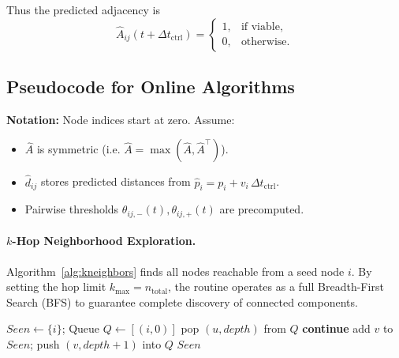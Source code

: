 \documentclass[preprint,12pt]{elsarticle}
\theoremstyle{definition}\newtheorem{definition}{Definition}
\theoremstyle{plain}\newtheorem{theorem}{Theorem}
\theoremstyle{plain}\newtheorem{lemma}{Lemma}
\theoremstyle{plain}\newtheorem{corollary}{Corollary}
\theoremstyle{plain}\newtheorem{assumption}{Assumption}
\theoremstyle{remark}\newtheorem{remark}[theorem]{Remark}
\begin{document}
Thus the predicted adjacency is
\[
   \widehat A_{ij}(t+\Delta t_{\text{ctrl}})
   =\begin{cases}1,&\text{if viable},\\0,&\text{otherwise.}\end{cases}
\]

\subsection{Pseudocode for Online Algorithms}
\label{subsec:pseudocode}

\noindent\textbf{Notation:} Node indices start at zero.  Assume:
\begin{itemize}[nosep]
  \item $\widehat A$ is symmetric (i.e. $\widehat A = \max(\widehat A,\widehat A^\top)$).  
  \item $\widehat d_{ij}$ stores predicted distances from $\widehat p_i = p_i + v_i\,\Delta t_{\text{ctrl}}$.  
  \item Pairwise thresholds $\theta_{ij,-}(t),\theta_{ij,+}(t)$ are precomputed.
\end{itemize}

\paragraph{$k$-Hop Neighborhood Exploration.}
Algorithm~\ref{alg:kneighbors} finds all nodes reachable from a seed node $i$. By setting the hop limit $k_{\max} = n_{\text{total}}$, the routine operates as a full Breadth-First Search (BFS) to guarantee complete discovery of connected components.

\begin{algorithm}[H]\small
  \caption{\textsc{KNeighbors} (depth-limited BFS on guaranteed edges)}
  \label{alg:kneighbors}
  \begin{algorithmic}[1]
    \State $Seen \gets \{i\}$; Queue $Q \gets [(i,0)]$
      \State pop $(u,depth)$ from $Q$
       \State \textbf{continue} \EndIf
          \State add $v$ to $Seen$; push $(v,depth+1)$ into $Q$
        \EndIf
      \EndFor
    \EndWhile
    \State \Return $Seen$
  \end{algorithmic}
\end{algorithm}
\end{document}
